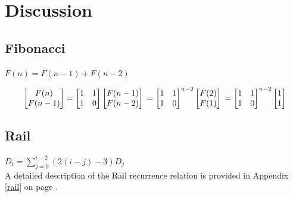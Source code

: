 \section{Discussion}
\subsection{Fibonacci} 
$F(n) = F(n - 1) + F(n - 2)$

$$ \begin{bmatrix}
        F(n)\\F(n-1)
    \end{bmatrix} =
    \begin{bmatrix}
        1 & 1\\
        1 & 0
    \end{bmatrix}
    \begin{bmatrix}
        F(n - 1)\\
        F(n - 2)
    \end{bmatrix}\\
    = 
    \begin{bmatrix}
        1 & 1\\
        1 & 0
    \end{bmatrix}^{n - 2}
    \begin{bmatrix}
        F(2)\\
        F(1)
    \end{bmatrix}\\
    =
    \begin{bmatrix}
        1 & 1\\
        1 & 0
    \end{bmatrix}^{n - 2}
    \begin{bmatrix}
        1\\
        1
    \end{bmatrix}
$$

\subsection{Rail} $D_i = \sum\limits_{j = 0}^{i - 2}(2(i - j) - 3)D_j$\\

A detailed description of the Rail recurrence relation is provided in Appendix \ref{rail} on page \pageref{rail}.

